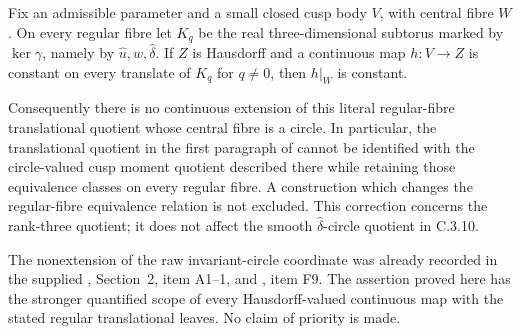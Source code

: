 \begin{proposition}
Fix an admissible parameter and a small closed cusp body $V$, with
central fibre $W$. On every regular fibre let $K_q$ be the real
three-dimensional subtorus marked by $\ker\gamma$, namely by
$\widehat u,\widehat w,\widehat\delta$.
If $Z$ is Hausdorff and a continuous map $h:V\to Z$ is constant
on every translate of $K_q$ for $q\ne0$, then $h|_W$ is constant.

Consequently there is no continuous extension of this literal
regular-fibre translational quotient whose central fibre is a
circle. In particular, the translational quotient in the first
paragraph of \citet[Remark 8.3]{E26} cannot be identified with the
circle-valued cusp moment quotient described there while retaining
those equivalence classes on every regular fibre. A construction
which changes the regular-fibre equivalence relation is not excluded.
This correction concerns the rank-three quotient; it does not affect
the smooth $\widehat\delta$-circle quotient in C.3.10.
\end{proposition}
The nonextension of the raw invariant-circle coordinate was already
recorded in the supplied ,
Section~2, item A1--1, and
, item F9.
The assertion proved here has the stronger quantified scope of every
Hausdorff-valued continuous map with the stated regular translational
leaves. No claim of priority is made.
